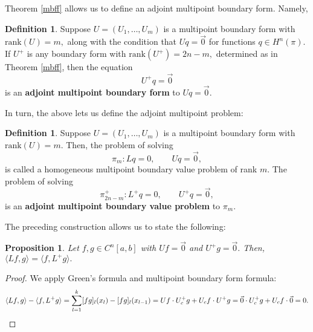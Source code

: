 \documentclass[11pt,reqno,oneside,a4paper]{article}
\theoremstyle{plain} %
\newtheorem{proposition}{Proposition}
\theoremstyle{definition}
\newtheorem{definition}[theorem]{Definition}
\theoremstyle{remark}
\begin{document}
Theorem \ref{mbff} allows us to define an adjoint multipoint boundary form. Namely, 
\newline
\begin{definition}
Suppose $U = (U_1, \ldots, U_m)$ is a multipoint boundary form with $\mathrm{rank}(U) = m,$ along with the condition that $Uq = \vec{0}$ for functions $q \in H^n(\pi).$ If $U^+$ is any boundary form with  $\mathrm{rank}(U^+) = 2n-m,$ determined as in Theorem \ref{mbff}, then the equation 
\[ 
U^+q = \vec{0}
\]
is an \textbf{adjoint multipoint boundary form} to $Uq = \vec{0}.$
\end{definition}

In turn, the above lets us define the adjoint multipoint problem:
\newline
\begin{definition}
Suppose $U = (U_1, \ldots, U_m)$ is a multipoint boundary form with $\mathrm{rank}(U) = m.$ Then, the problem of solving 
\[ \pi_m: Lq = 0, \qquad Uq = \vec{0},\] 
is called a homogeneous multipoint boundary value problem of rank $m.$ The problem of solving 
\[ \pi_{2n-m}^+: L^+q = 0, \qquad U^+q = \vec{0},\] 
is an \textbf{adjoint multipoint boundary value problem} to $\pi_m.$
\end{definition}

The preceding construction allows us to state the following:
\newline
\begin{proposition}
Let $f,g \in C^n[a,b]$ with $Uf = \vec{0}$ and $U^+g = \vec{0}.$ Then, $\langle Lf, g\rangle = \langle f, L^+g\rangle.$
\end{proposition}
\begin{proof}
We apply Green's formula and multipoint boundary form formula:
\[ \langle Lf, g\rangle - \langle f, L^+g\rangle = \sum^k_{l=1}  [fg]_l(x_l) - [fg]_l(x_{l-1}) = Uf\cdot U^+_c g + U_c f \cdot U^+ g = \vec{0}\cdot U^+_c g + U_c f \cdot \vec{0} = 0. \qedhere\]
\end{proof}
\end{document}
